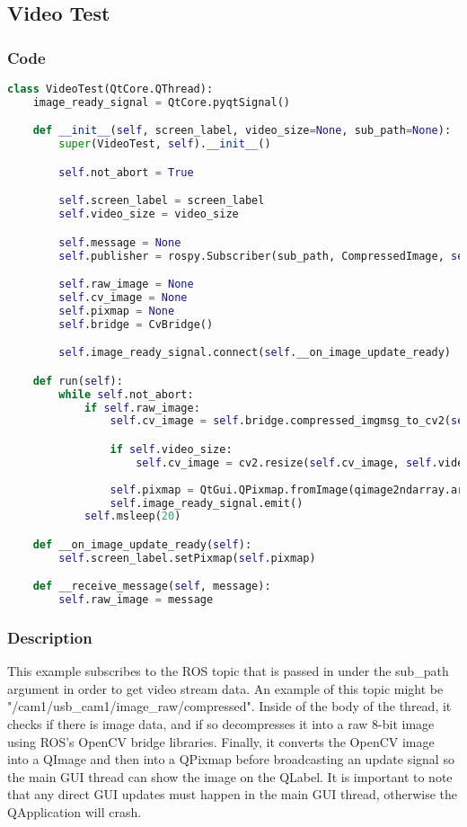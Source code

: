 \subsection{Video Test}
\subsubsection{Code}
\begin{lstlisting}[language=python]
class VideoTest(QtCore.QThread):
    image_ready_signal = QtCore.pyqtSignal()

    def __init__(self, screen_label, video_size=None, sub_path=None):
        super(VideoTest, self).__init__()

        self.not_abort = True

        self.screen_label = screen_label
        self.video_size = video_size

        self.message = None
        self.publisher = rospy.Subscriber(sub_path, CompressedImage, self.__receive_message)

        self.raw_image = None
        self.cv_image = None
        self.pixmap = None
        self.bridge = CvBridge()

        self.image_ready_signal.connect(self.__on_image_update_ready)

    def run(self):
        while self.not_abort:
            if self.raw_image:
                self.cv_image = self.bridge.compressed_imgmsg_to_cv2(self.raw_image, "rgb8")

                if self.video_size:
                    self.cv_image = cv2.resize(self.cv_image, self.video_size)
                    
                self.pixmap = QtGui.QPixmap.fromImage(qimage2ndarray.array2qimage(self.cv_image))
                self.image_ready_signal.emit()
            self.msleep(20)

    def __on_image_update_ready(self):
        self.screen_label.setPixmap(self.pixmap)

    def __receive_message(self, message):
        self.raw_image = message
\end{lstlisting}
\subsubsection{Description}
This example subscribes to the ROS topic that is passed in under the sub\_path argument in order to get video stream data.
An example of this topic might be "/cam1/usb\_cam1/image\_raw/compressed".
Inside of the body of the thread, it checks if there is image data, and if so decompresses it into a raw 8-bit image using ROS's OpenCV bridge libraries.
Finally, it converts the OpenCV image into a QImage and then into a QPixmap before broadcasting an update signal so the main GUI thread can show the image on the QLabel.
It is important to note that any direct GUI updates must happen in the main GUI thread, otherwise the QApplication will crash.